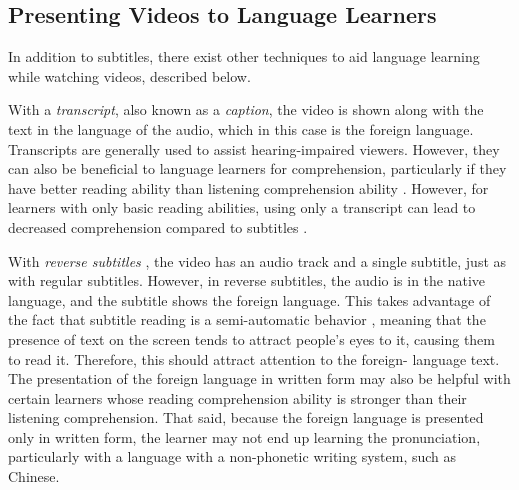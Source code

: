 \documentclass{sigchi}
\begin{document}
\subsection{Presenting Videos to Language Learners}


In addition to subtitles, there exist other techniques to aid language learning
while watching videos, described below.

With a \emph{transcript}, also known as a \emph{caption}, the video is shown along with the text in the
language of the audio, which in this case is the foreign language. Transcripts are generally used to
assist hearing-impaired viewers. However, they can also be beneficial to language learners for
comprehension, particularly if they have better reading ability than
listening comprehension ability \cite{danan2004captioning}. However,
for learners with only basic reading abilities,
using only a transcript can lead to decreased comprehension compared to subtitles \cite{bianchi2008captions}.

With \emph{reverse subtitles} \cite{danan1992reversed}, the video has an audio track and a single subtitle, just as with regular
subtitles. However, in reverse subtitles, the audio is in the native language, and
the subtitle shows the foreign language. This takes advantage of the fact that subtitle reading is
a semi-automatic behavior \cite{d2002foreign}, meaning that the presence of text on the screen tends to attract
people's eyes to it, causing them to read it. Therefore, this should attract attention to the foreign-
language text. The presentation of the foreign language in written form may also be helpful with
certain learners whose reading comprehension ability is stronger than their listening
comprehension. That said, because the foreign language is presented only in written form, the
learner may not end up learning the pronunciation, particularly with a language with a non-phonetic writing system, such as Chinese.
\end{document}
